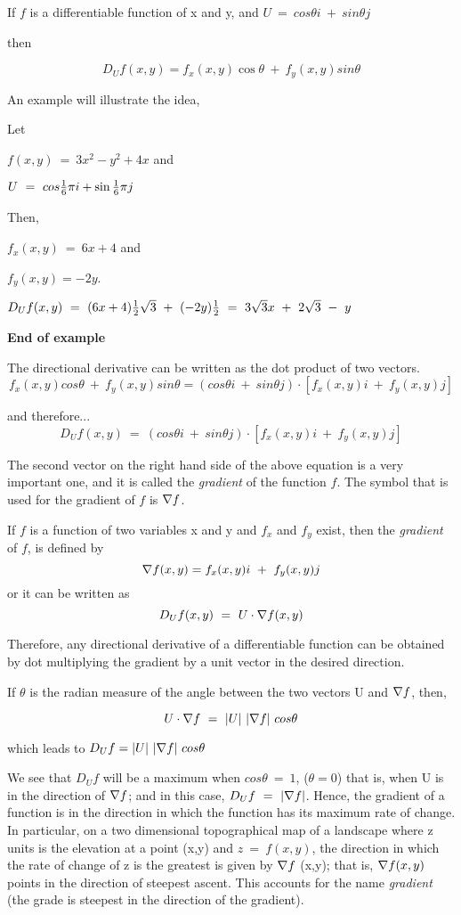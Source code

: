 	If $f$ is a differentiable function of x and y, and $U \ = \ cos
\theta i \ + \ sin \theta j$ 

	then 	

	$$D_Uf(x,y) = f_x(x,y) \cos\theta \ + \ f_y(x,y) sin\theta$$
        
	An example will illustrate the idea,

	Let 

       $f(x,y)\ = \ 3x^2 - y^2 + 4x$  and  

       $U \ = \ cos{ 1\over 6}\pi i + \sin {1 \over 6}\pi j$

       Then, 

       $f_x(x,y)\ = \ 6x + 4$  and  

       $f_y(x,y) = -2y$.

	$D_Uf(x,y)\ = \ (6x + 4){1 \over 2}\sqrt3\ + \ (-2y){1
\over 2}\ = \ 3\sqrt3x \ + \ 2\sqrt3\ - \ y$

{\bf End of example}

	The directional derivative can be written as the dot product
of two vectors. 
	$$f_x(x,y) cos \theta\ + \ f_y(x,y) sin \theta = (cos \theta i
\ +\ sin \theta j) \cdot [f_x(x,y)i\ + \ f_y(x,y)j]$$

	and therefore...
	$$D_Uf(x,y) \ = \ (cos \theta i \ + \ sin \theta j) \cdot
[f_x(x,y)i \ + \ f_y(x,y)j]$$

	The second vector on the right hand side of the above equation
is a very important one, and it is called the {\it gradient} of the
function $f$.  The symbol that is used for the gradient of $f$ is ${\bf \nabla} f$.

	If $f$ is a function of two variables x and y and $f_x$ and
$f_y$ exist, then the {\it gradient} of $f$, is defined by
	$${\bf \nabla}f(x,y) = f_x(x,y)i\ + \ f_y(x,y)j$$ 
	or it can be written as
	$$D_Uf(x,y)\ = \ U \cdot {\bf \nabla}f(x,y)$$

	Therefore, any directional derivative of a differentiable
function can be obtained by dot multiplying the gradient by a unit
vector in the desired direction.

	If $\theta$ is the radian measure of the angle between the two
vectors U and ${\bf \nabla}f$, then,

	$$U \cdot {\bf \nabla}f \ = \ |U| \  | {\bf \nabla} f|\  cos \theta$$

	which leads to $D_Uf = |U| \ |{\bf \nabla}f|\ cos \theta$

	We see that $D_Uf$ will be a maximum when $cos \theta\ = \ 1$,
($\theta = 0$) that is, when U is in
the direction of ${\bf \nabla}f$; and in this case, $D_Uf\ = \ |{\bf
\nabla}f|$.  Hence, the gradient of a function is in the direction in
which the function has its maximum rate of change.  In particular, on
a two dimensional topographical map of a landscape where z units is
the elevation at a point (x,y) and $z\ = \ f(x,y)$, the direction in
which the rate of change of z is the greatest is given by ${\bf
\nabla}f$ (x,y); that is, ${\bf \nabla}f(x,y)$ points in the direction
of steepest ascent.  This accounts for the name {\it gradient} (the
grade is steepest in the direction of the gradient).

